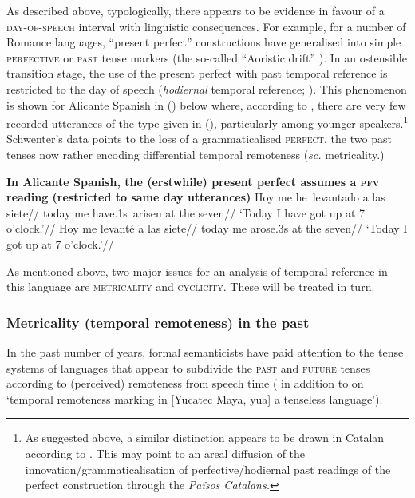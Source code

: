\documentclass[11pt,dvipsnames]{report}
\begin{document}
As described above, typologically, there appears to be evidence in favour of a \textsc{day-of-speech} interval with linguistic consequences. For example, for a number of Romance languages, ``present perfect'' constructions have generalised into simple \textsc{perfective} or \textsc{past} tense markers (the so-called ``Aoristic drift'' \citealp[cf.][]{Schaden2012}). In an ostensible transition stage, the use of the present perfect with past temporal reference is restricted to the day of speech (\textit{hodiernal} temporal reference;\label{hod} \citealp{Comrie1985,Dahl1985}). This phenomenon is shown for Alicante Spanish in (\nextx) below where, according to \cite{Schwenter1994}, there are very few recorded utterances of the type given in (), particularly among younger speakers.\footnote{As suggested above, a similar distinction appears to be drawn in Catalan according to \citet{CurelliGotor1990}. This may point to an areal diffusion of the innovation/grammaticalisation of perfective/hodiernal past readings of the perfect construction through the \textit{Països Catalans.}} Schwenter's data points to the loss of a grammaticalised \textsc{perfect}, the two past tenses now rather encoding differential temporal remoteness (\textit{sc.} metricality.)

\pex\textbf{In Alicante Spanish, the (erstwhile) present perfect assumes a \textsc{pfv} reading (restricted to same day utterances)}
\a\begingl\gla Hoy me he~levantado a las siete//
\glb today me have.1s~arisen at the seven//
\glft`Today I have got up at 7 o'clock.'//\endgl
\a\begingl\gla\nogloss{\ljudge{$ ^{*\%} $}} Hoy me levanté a las siete//
\glb today me arose.3s at the seven//
\glft`Today I got up at 7 o'clock.'//\endgl\xe




As mentioned above, two major issues for an analysis of temporal reference in this language are \textsc{metricality} and \textsc{cyclicity}. These will be treated in turn.

\subsubsection{Metricality (temporal remoteness) in the past}\label{metr-sec}

In the past number of years, formal semanticists have paid attention to the tense systems of languages that appear to subdivide the \textsc{past} and \textsc{future} tenses according to (perceived) remoteness from speech time (\citealp[e.g.][]{Cable2013,Klecha2016} in addition to \citealp{Bohnemeyer2018} on `temporal remoteness marking in [Yucatec Maya, \gls{yua}] a tenseless language').
\end{document}
